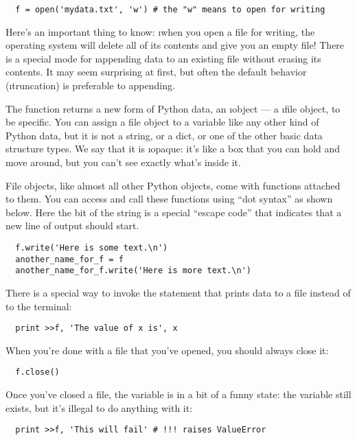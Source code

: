 \documentclass[letterpaper, 12pt, titlepage, twoside]{article}
\begin{document}
\begin{lstlisting}
  f = open('mydata.txt', 'w') # the "w" means to open for writing
\end{lstlisting}

Here's an important thing to know: \i{when you open a file for writing, the
  operating system will delete all of its contents and give you an empty
  file!} There is a special  mode for \i{appending} data to an existing
file without erasing its contents. It may seem surprising at first, but often
the default behavior (\i{truncation}) is preferable to appending.

The  function returns a new form of Python data, an \i{object} --- a
\i{file object}, to be specific. You can assign a file object to a variable
like any other kind of Python data, but it is not a string, or a dict, or one
of the other basic data structure types. We say that it is \i{opaque}: it's
like a box that you can hold and move around, but you can't see exactly what's
inside it.

File objects, like almost all other Python objects, come with functions
attached to them. You can access and call these functions using ``dot syntax''
as shown below. Here the  bit of the string is a special
``escape code'' that indicates that a new line of output should start.

\begin{lstlisting}
  f.write('Here is some text.\n')
  another_name_for_f = f
  another_name_for_f.write('Here is more text.\n')
\end{lstlisting}

There is a special way to invoke the  statement that prints data to a
file instead of to the terminal:

\begin{lstlisting}
  print >>f, 'The value of x is', x
\end{lstlisting}

When you're done with a file that you've opened, you should always close it:

\begin{lstlisting}
  f.close()
\end{lstlisting}

Once you've closed a file, the  variable is in a bit of a funny state:
the variable still exists, but it's illegal to do anything with it:

\begin{lstlisting}
  print >>f, 'This will fail' # !!! raises ValueError
\end{lstlisting}
\end{document}
